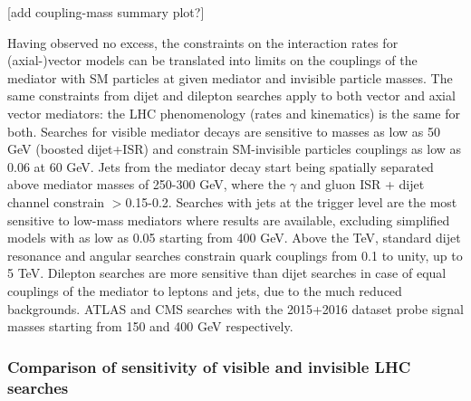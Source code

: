 
[add coupling-mass summary plot?]

Having observed no excess, the constraints on the interaction rates for (axial-)vector models can be translated into limits on the couplings of the mediator with SM particles at given mediator and invisible particle masses. 
The same constraints from dijet and dilepton searches apply to both vector and axial vector mediators: the LHC phenomenology (rates and kinematics) is the same for both. 
Searches for visible mediator decays are sensitive to masses as low as 50 GeV (boosted dijet+ISR) and constrain SM-invisible particles couplings \gq as low as 0.06 at 60 GeV. Jets from the mediator decay start being spatially separated above mediator masses of 250-300 GeV, where the $\gamma$ and gluon ISR + dijet channel constrain \gq$>$0.15-0.2. Searches with jets at the trigger level are the most sensitive to low-mass mediators where results are available, excluding simplified models with \gq as low as 0.05 starting from 400 GeV. Above the TeV, standard dijet resonance and angular searches constrain quark couplings from 0.1 to unity, up to 5 TeV. 
Dilepton searches are more sensitive than dijet searches in case of equal couplings of the mediator to leptons and jets, due to the much reduced backgrounds. ATLAS and CMS searches with the 2015+2016 dataset probe signal masses starting from 150 and 400 GeV respectively. 



\subsubsection{Comparison of sensitivity of visible and invisible LHC searches}
\label{sub:comparisonVisibleInvisible}

